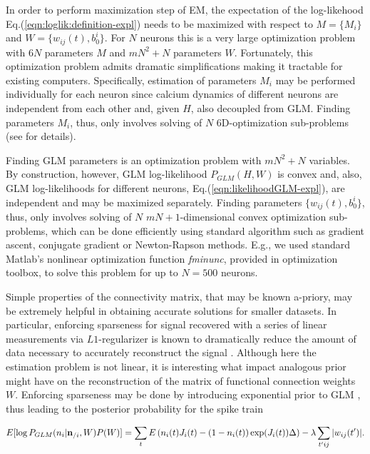 In order to perform maximization step of EM, the expectation of the log-likehood  Eq.(\ref{eqn:loglik:definition-expl}) needs to be maximized with respect to $M=\{M_i\}$ and $W=\{w_{ij}(t), b_0^i\}$. For $N$ neurons this is a very large optimization problem with $6N$ parameters $M$ and $m N^2 + N$ parameters $W$.  Fortunately, this optimization problem admits dramatic simplifications making it tractable for existing computers.  Specifically, estimation of parameters $M_i$ may be performed individually for each neuron since calcium dynamics of different neurons are independent from each other and, given $H$, also decoupled from GLM. Finding parameters $M_i$, thus, only involves solving of $N$ 6D-optimization sub-problems (see \cite{Vogelstein2009} for details).

Finding GLM parameters is an optimization problem with $mN^2+N$ variables. By construction, however, GLM log-likelihood $P_{GLM}(H, W)$ is convex and, also, GLM log-likelihoods for different neurons, Eq.(\ref{eqn:likelihoodGLM-expl}), are independent and may be maximized separately. Finding parameters $\{w_{ij}(t), b^i_0\}$, thus, only involves solving of $N$ $mN+1$-dimensional convex optimization sub-problems, which can be done efficiently using standard algorithm such as gradient ascent, conjugate gradient or Newton-Rapson methods. E.g., we used standard Matlab's nonlinear optimization function {\em fminunc}, provided in optimization toolbox, to solve this problem for up to $N=500$ neurons.

Simple properties of the connectivity matrix, that may be known a-priory, may be extremely helpful in obtaining accurate solutions for smaller datasets. In particular, enforcing sparseness for signal recovered with a series of linear measurements via $L1$-regularizer is known to dramatically reduce the amount of data necessary to accurately reconstruct the signal \cite{Candes2005, DE03, Mishchenko2009}. Although here the estimation problem is not linear, it is interesting what impact analogous prior might have on the reconstruction of the matrix of functional connection weights $W$. Enforcing sparseness may be done by introducing exponential prior to GLM \cite{Stevenson2009}, thus leading to the posterior probability for the spike train

\begin{equation}\label{eqn:likelihoodsparseGLM}
E[\log P_{GLM}(n_i|{\bf n}_{/i}, W)P(W)]=\sum_t E\left( n_i(t) J_i(t) - (1-n_i(t)) \exp(J_i(t)) \Delta \right)-\lambda \sum_{t'ij}|w_{ij}(t')|.
\end{equation}

